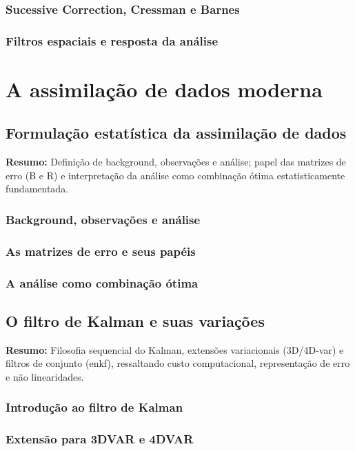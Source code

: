 \documentclass[12pt,a4paper,oneside]{book}
\begin{document}
\section{Sucessive Correction, Cressman e Barnes}
\section{Filtros espaciais e resposta da análise}

\part{A assimilação de dados moderna}

\chapter{Formulação estatística da assimilação de dados}
\noindent\textbf{Resumo:} Definição de background, observações e análise; papel das matrizes de erro (B e R) e interpretação da análise como combinação ótima estatisticamente fundamentada.
\section{Background, observações e análise}
\section{As matrizes de erro e seus papéis}
\section{A análise como combinação ótima}

\chapter{O filtro de Kalman e suas variações}
\noindent\textbf{Resumo:} Filosofia sequencial do Kalman, extensões variacionais (3D/4D-\gls{var}) e filtros de conjunto (\gls{enkf}), ressaltando custo computacional, representação de erro e não linearidades.
\section{Introdução ao filtro de Kalman}
\section{Extensão para 3DVAR e 4DVAR}
\end{document}
